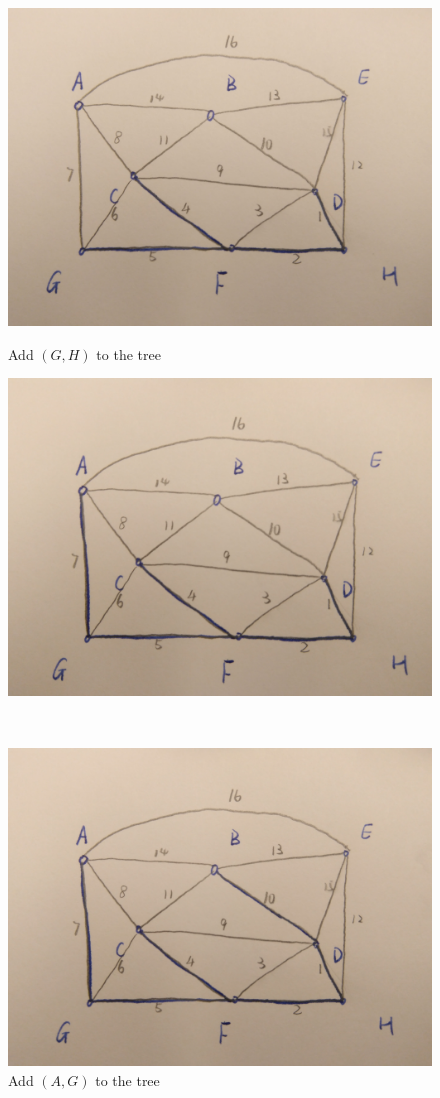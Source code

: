 \documentclass[11pt]{article}
\begin{document}
\begin{figure}[H]
	\begin{minipage}[t]{0.50\linewidth}
		\centering
		\includegraphics[width=0.85\linewidth]{Figure/1a5.jpg}
		\caption{Add $(G,H)$ to the tree}
		\label{fig:subfig1:e}
	\end{minipage}
	\begin{minipage}[t]{0.50\linewidth}
		\centering
		\includegraphics[width=0.85\linewidth]{Figure/1a6.jpg}
		\caption{Add $(A,G)$ to the tree}
		\label{fig:subfig1:f}
	\end{minipage}
\\
	\begin{minipage}[t]{0.50\linewidth}
		\centering
		\includegraphics[width=0.85\linewidth]{Figure/1a7.jpg}

\end{minipage}
\end{figure}
\end{document}
